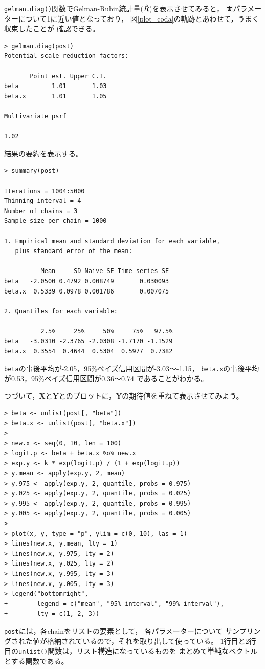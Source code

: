 \documentclass[11pt,uplatex]{jsarticle}
\begin{document}
\texttt{gelman.diag()}関数でGelman-Rubin統計量($\Hat{R}$)を表示させてみると，
両パラメーターについて1に近い値となっており，
図\ref{plot_coda}の軌跡とあわせて，うまく収束したことが
確認できる。
\begin{lstlisting}
> gelman.diag(post)
Potential scale reduction factors:

       Point est. Upper C.I.
beta         1.01       1.03
beta.x       1.01       1.05

Multivariate psrf

1.02
\end{lstlisting}


結果の要約を表示する。
\begin{lstlisting}
> summary(post)

Iterations = 1004:5000
Thinning interval = 4 
Number of chains = 3 
Sample size per chain = 1000 

1. Empirical mean and standard deviation for each variable,
   plus standard error of the mean:

          Mean     SD Naive SE Time-series SE
beta   -2.0500 0.4792 0.008749       0.030093
beta.x  0.5339 0.0978 0.001786       0.007075

2. Quantiles for each variable:

          2.5%     25%     50%     75%   97.5%
beta   -3.0310 -2.3765 -2.0308 -1.7170 -1.1529
beta.x  0.3554  0.4644  0.5304  0.5977  0.7382

\end{lstlisting}

\noindent
\texttt{beta}の事後平均が-2.05，95\%ベイズ信用区間が-3.03〜-1.15，
\texttt{beta.x}の事後平均が0.53，95\%ベイズ信用区間が0.36〜0.74
であることがわかる。


つづいて，$\bm{X}$と$\bm{Y}$とのプロットに，$\bm{Y}$の期待値を重ねて表示させてみよう。
\begin{lstlisting}
> beta <- unlist(post[, "beta"])
> beta.x <- unlist(post[, "beta.x"])
> 
> new.x <- seq(0, 10, len = 100)
> logit.p <- beta + beta.x %o% new.x
> exp.y <- k * exp(logit.p) / (1 + exp(logit.p))
> y.mean <- apply(exp.y, 2, mean)
> y.975 <- apply(exp.y, 2, quantile, probs = 0.975)
> y.025 <- apply(exp.y, 2, quantile, probs = 0.025)
> y.995 <- apply(exp.y, 2, quantile, probs = 0.995)
> y.005 <- apply(exp.y, 2, quantile, probs = 0.005)
> 
> plot(x, y, type = "p", ylim = c(0, 10), las = 1)
> lines(new.x, y.mean, lty = 1)
> lines(new.x, y.975, lty = 2)
> lines(new.x, y.025, lty = 2)
> lines(new.x, y.995, lty = 3)
> lines(new.x, y.005, lty = 3)
> legend("bottomright",
+        legend = c("mean", "95% interval", "99% interval"),
+        lty = c(1, 2, 3))
\end{lstlisting}
\noindent
\texttt{post}には，各chainをリストの要素として，
各パラメーターについて
サンプリングされた値が格納されているので，それを取り出して使っている。
1行目と2行目の\texttt{unlist()}関数は，リスト構造になっているものを
まとめて単純なベクトルとする関数である。
\end{document}
